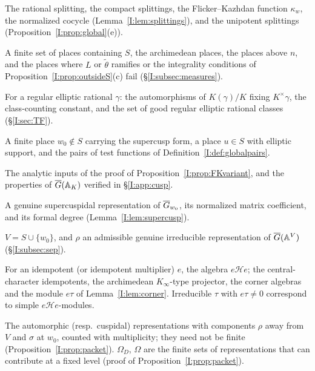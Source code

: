\begin{description}[style=nextline,leftmargin=1.5em]
\item[$\iota$, $\ks_v$, $\kappa_w$, $\tau_w$, $s_N$] The rational splitting, the compact splittings, the Flicker--Kazhdan function $\kappa_w$, the normalized cocycle (Lemma~\ref{I:lem:splittings}), and the unipotent splittings (Proposition~\ref{I:prop:global}(e)).
\item[$S_D$] A finite set of places containing $S$, the archimedean places, the places above $n$, and the places where $L$ or $\tilde\theta$ ramifies or the integrality conditions of Proposition~\ref{I:prop:outsideS}(c) fail (\S\ref{I:subsec:measures}).
\item[$W_\gamma$, $c(\gamma)$, $\mathcal O_H$] For a regular elliptic rational $\gamma$: the automorphisms of $K(\gamma)/K$ fixing $K^\times\gamma$, the class-counting constant, and the set of good regular elliptic rational classes (\S\ref{I:sec:TF}).
\item[$w_0$, $u$; admissible pair] A finite place $w_0\notin S$ carrying the supercusp form, a place $u\in S$ with elliptic support, and the pairs of test functions of Definition~\ref{I:def:globalpairs}.
\item[(A1), (A2); (R1)--(R5)] The analytic inputs of the proof of Proposition~\ref{I:prop:FKvariant}, and the properties of $\overline G(\mathbb A_K)$ verified in \S\ref{I:app:cusp}.
\item[$\sigma$, $\tilde f_\sigma$, $d(\sigma)$] A genuine supercuspidal representation of $\overline G_{w_0}$, its normalized matrix coefficient, and its formal degree (Lemma~\ref{I:lem:supercusp}).
\item[$V$, $\rho$] $V=S\cup\{w_0\}$, and $\rho$ an admissible genuine irreducible representation of $\overline G(\mathbb A^V)$ (\S\ref{I:subsec:sep}).
\item[Corner Hecke algebra; $e_v$, $e_{\mathfrak t}$, $A_v$, $A_\infty$, $A$, $e\tau$] For an idempotent (or idempotent multiplier) $e$, the algebra $e\mathcal He$; the central-character idempotents, the archimedean $K_\infty$-type projector, the corner algebras and the module $e\tau$ of Lemma~\ref{I:lem:corner}. Irreducible $\tau$ with $e\tau\ne0$ correspond to simple $e\mathcal He$-modules.
\item[Near-equivalence packets $P_D(\rho)$, $P(\rho)$] The automorphic (resp.\ cuspidal) representations with components $\rho$ away from $V$ and $\sigma$ at $w_0$, counted with multiplicity; they need not be finite (Proposition~\ref{I:prop:packet}). $\Omega_D$, $\Omega$ are the finite sets of representations that can contribute at a fixed level (proof of Proposition~\ref{I:prop:packet}).

\end{description}
